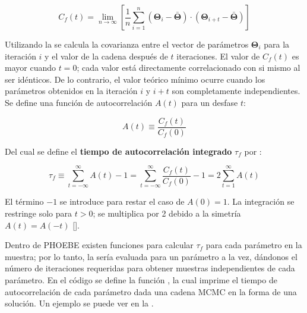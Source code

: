 \begin{eqfloat}[!ht]
	\begin{equation}
		C_f(t) = \lim_{n \rightarrow \infty} \left[\frac{1}{n} \sum_{i=1}^{n}{(\mathbf{\Theta}_i - \bar{\mathbf{\Theta}}) \cdot (\mathbf{\Theta}_{i+t} - \bar{\mathbf{\Theta}})}\right]
	\end{equation}
	\blankcaption
	\label{ecuacionAutocovarianza}
\end{eqfloat}

Utilizando la  se calcula la covarianza
entre el vector de parámetros $\mathbf{\Theta}_i$ para la iteración $i$ y el
valor de la cadena después de $t$ iteraciones. El valor de $C_f(t)$ es mayor
cuando $t = 0$; cada valor está directamente correlacionado con si mismo al ser
idénticos. De lo contrario, el valor teórico mínimo ocurre cuando los parámetros
obtenidos en la iteración $i$ y $i+t$ son completamente independientes. Se
define una función de autocorrelación $A(t)$ para un desfase $t$:

\begin{eqfloat}[!ht]
	\begin{equation}
		A(t) \equiv \frac{C_f(t)}{C_f(0)}
	\end{equation}
\end{eqfloat}

Del cual se define el \textbf{tiempo de autocorrelación integrado} $\tau_f$
por :

\begin{eqfloat}[!ht]
	\begin{equation}
		\tau_f \equiv \sum_{t = -\infty}^{\infty} A(t) - 1 = \sum_{t = -\infty}^{\infty} \frac{C_f(t)}{C_f(0)} - 1 = 2 \sum_{t = 1}^{\infty} A(t)
	\end{equation}
	\blankcaption
	\label{ecuacionAutocorrIntegrado}
\end{eqfloat}

El término $-1$ se introduce para restar el caso de $A(0) = 1$. La integración
se restringe solo para $t > 0$; se multiplica por 2 debido a la simetría $A(t) =
A(-t)$ []. 

Dentro de PHOEBE existen funciones para calcular $\tau_f$ para cada parámetro en
la muestra; por lo tanto, la  sería evaluada
para un parámetro a la vez, dándonos el número de iteraciones requeridas para
obtener muestras independientes de cada parámetro. En el código
\href{https://github.com/KnightIV/UANL_MAPTA_Observaciones/blob/main/analisis/phoebe_model/sampling/mcmc_utils.py}{}
se define la función , la cual imprime el
tiempo de autocorrelación de cada parámetro dada una cadena MCMC en la forma de
una solución. Un ejemplo se puede ver en la
.

